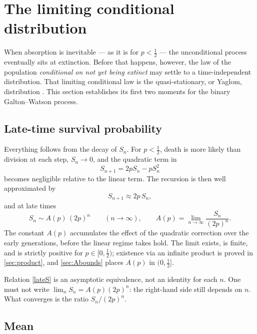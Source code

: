 \section{The limiting conditional distribution}
\label{sec:qsd}

When absorption is inevitable --- as it is for \(p<\tfrac12\) --- the unconditional process eventually sits at extinction. Before that happens, however, the law of the population \emph{conditional on not yet being extinct} may settle to a time-independent distribution. That limiting conditional law is the quasi-stationary, or Yaglom, distribution \cite{Yaglom1947,Athreya1972}. This section establishes its first two moments for the binary Galton--Watson process.

\subsection{Late-time survival probability}
\label{sec:lateS}

Everything follows from the decay of \(S_n\). For \(p<\tfrac12\), death is more likely than division at each step, \(S_n\to0\), and the quadratic term in
\begin{equation*}
S_{n+1} = 2pS_n - pS_n^2
\end{equation*}
becomes negligible relative to the linear term. The recursion is then well approximated by
\begin{equation}
\label{attenuated}
S_{n+1} \approx 2p\,S_n,
\end{equation}
and at late times
\begin{equation}
\label{lateS}
S_n \sim A(p)\,(2p)^n \qquad (n\to\infty),
\qquad
A(p) = \lim_{n\to\infty}\frac{S_n}{(2p)^n}.
\end{equation}
The constant \(A(p)\) accumulates the effect of the quadratic correction over the early generations, before the linear regime takes hold. The limit exists, is finite, and is strictly positive for \(p\in[0,\tfrac12)\); existence via an infinite product is proved in \cref{sec:product}, and \cref{sec:Abounds} places \(A(p)\) in \((0,\tfrac12]\).

\begin{remark}
Relation \cref{lateS} is an asymptotic equivalence, not an identity for each \(n\). One must not write \(\lim_n S_n = A(p)(2p)^n\): the right-hand side still depends on \(n\). What converges is the ratio \(S_n/(2p)^n\).
\end{remark}

\subsection{Mean}
\label{sec:condmean}

